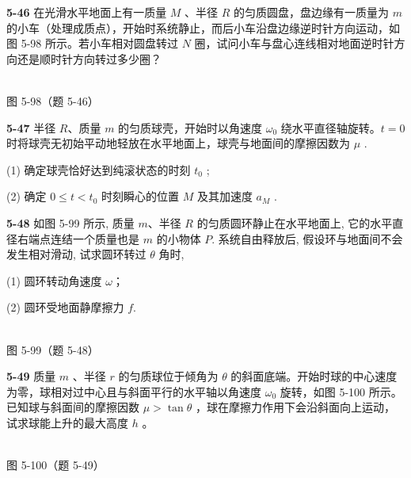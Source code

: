\textbf{5-46} 在光滑水平地面上有一质量 $M$ 、半径 $R$ 的匀质圆盘，盘边缘有一质量为 $m$ 的小车（处理成质点），开始时系统静止，而后小车沿盘边缘逆时针方向运动，如图 5-98 所示。若小车相对圆盘转过 $N$ 圈，试问小车与盘心连线相对地面逆时针方向还是顺时针方向转过多少圈？

\begin{center}
\resizebox{0.35\textwidth}{!}{}\\[4pt]
{\small 图 5-98（题 5-46）}
\end{center}

\newpage

\textbf{5-47} 半径 $R$、质量 $m$ 的匀质球壳，开始时以角速度 $\omega_{0}$ 绕水平直径轴旋转。$t=0$ 时将球壳无初始平动地轻放在水平地面上，球壳与地面间的摩擦因数为 $\mu$ .

(1) 确定球壳恰好达到纯滚状态的时刻 $t_{0}$ ;

(2) 确定 $0 \leqslant t < t_{0}$ 时刻瞬心的位置 $M$ 及其加速度 $a_{M}$ .

\newpage

\textbf{5-48} 如图 5-99 所示, 质量 $m$、半径 $R$ 的匀质圆环静止在水平地面上, 它的水平直径右端点连结一个质量也是 $m$ 的小物体 $P$. 系统自由释放后, 假设环与地面间不会发生相对滑动, 试求圆环转过 $\theta$ 角时,

(1) 圆环转动角速度 $\omega$；

(2) 圆环受地面静摩擦力 $f$.

\begin{center}
\resizebox{0.33\textwidth}{!}{}\\[4pt]
{\small 图 5-99（题 5-48）}
\end{center}

\newpage

\textbf{5-49} 质量 $m$ 、半径 $r$ 的匀质球位于倾角为 $\theta$ 的斜面底端。开始时球的中心速度为零，球相对过中心且与斜面平行的水平轴以角速度 $\omega_0$ 旋转，如图 5-100 所示。已知球与斜面间的摩擦因数 $\mu > \tan \theta$ ，球在摩擦力作用下会沿斜面向上运动，试求球能上升的最大高度 $h$ 。

\begin{center}
\resizebox{0.50\textwidth}{!}{}\\[4pt]
{\small 图 5-100（题 5-49）}
\end{center}

\newpage

